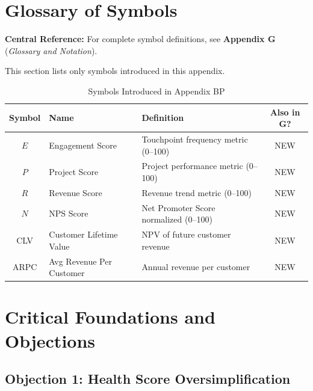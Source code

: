\section{Glossary of Symbols}
\label{sec:bp-glossary}

\begin{tcolorbox}[colback=blue!5!white, colframe=blue!75!black]
\textbf{Central Reference:} For complete symbol definitions, see
\textbf{Appendix G} (\textit{Glossary and Notation}).

This section lists only symbols introduced in this appendix.
\end{tcolorbox}

\begin{table}[htbp]
\centering
\caption{Symbols Introduced in Appendix BP}
\label{tab:bp-symbols}
\renewcommand{\arraystretch}{1.3}
\begin{tabular}{@{}clp{6cm}c@{}}
\toprule
\textbf{Symbol} & \textbf{Name} & \textbf{Definition} & \textbf{Also in G?} \\
\midrule
$E$ & Engagement Score & Touchpoint frequency metric (0--100) & NEW \\
$P$ & Project Score & Project performance metric (0--100) & NEW \\
$R$ & Revenue Score & Revenue trend metric (0--100) & NEW \\
$N$ & NPS Score & Net Promoter Score normalized (0--100) & NEW \\
CLV & Customer Lifetime Value & NPV of future customer revenue & NEW \\
ARPC & Avg Revenue Per Customer & Annual revenue per customer & NEW \\
\bottomrule
\end{tabular}
\end{table}


\section{Critical Foundations and Objections}
\label{sec:bp-foundations}

\subsection{Objection 1: Health Score Oversimplification}

